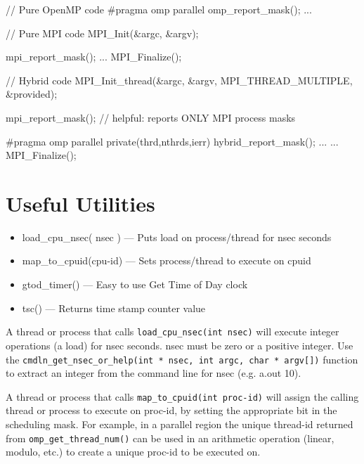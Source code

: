 \documentclass[10pt,a4paper]{report}
\begin{document}
\begin{code}[frame=single,breaklines=true,numbers=left,language=C,caption=Invoking mask report inside code\label{code:apimask}]
 // Pure OpenMP code
    #pragma omp parallel
    {
       omp_report_mask();
     ...
    }

 // Pure MPI code
    MPI_Init(&argc, &argv);

       mpi_report_mask();
    ...
    MPI_Finalize();

 // Hybrid code
    MPI_Init_thread(&argc, &argv, MPI_THREAD_MULTIPLE, &provided);

    mpi_report_mask();  // helpful: reports ONLY MPI process masks

   #pragma omp parallel private(thrd,nthrds,ierr)
   {
      hybrid_report_mask();
      ...
   }
   ...
   MPI_Finalize();
\end{code}


\section{Useful Utilities}
\begin{itemize}
\item load\_cpu\_nsec( nsec )   --- Puts load on process/thread for nsec seconds
\item map\_to\_cpuid(cpu-id)   --- Sets process/thread to execute on cpuid
\item gtod\_timer()           --- Easy to use Get Time of Day clock
\item tsc() --- Returns time stamp counter value
\end{itemize}

A thread or process that calls \verb+load_cpu_nsec(int nsec)+ will execute integer
operations (a load) for nsec seconds.  nsec must be zero or a positive integer.  Use the
\verb+cmdln_get_nsec_or_help(int * nsec, int argc, char * argv[])+ function to extract an
integer from the command line for nsec (e.g. a.out 10).


A thread or process that calls \verb+map_to_cpuid(int proc-id)+ will assign the
calling thread or process to execute on proc-id, by setting the appropriate
bit in the scheduling mask.  For example, in a parallel region the unique
thread-id returned from \verb+omp_get_thread_num()+ can be used in an
arithmetic operation (linear, modulo, etc.) to create a unique proc-id to be executed on. 
\end{document}

